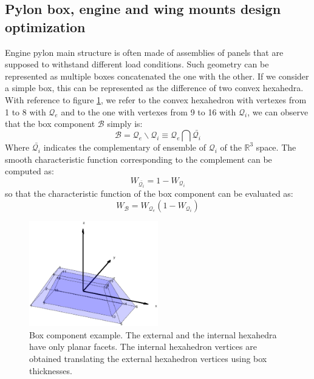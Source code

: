  \subsection{Pylon box, engine and wing mounts design optimization}
  \label{ss3.10.4}
  Engine pylon main structure is often made of assemblies of panels that are supposed to withstand different load conditions. Such geometry can be represented as multiple boxes concatenated the one with the other. If we consider a simple box, this can be represented as the difference of two convex hexahedra. With reference to figure \ref{fig:3.40}, we refer to the convex hexahedron with vertexes from 1 to 8 with $\mathscr{Q}_{e}$ and to the one with vertexes from 9 to 16 with $\mathscr{Q}_{i}$, we can observe that the box component  $\mathscr{B}$ simply is:
  \begin{equation}
\mathscr{B}=\mathscr{Q}_{e}\backslash\mathscr{Q}_{i}\equiv \mathscr{Q}_{e}\bigcap\bar{\mathscr{Q}_{i}}
  \end{equation}
  Where $\bar{\mathscr{Q}_{i}}$ indicates the complementary of ensemble of $\mathscr{Q}_{i}$ of the $\mathbb{R}^3$ space. 
  The smooth characteristic function corresponding to the complement can be computed as:
    \begin{equation}
 W_{\bar{\mathscr{Q}_{i}}}=1-W_{\mathscr{Q}_{i}}
    \end{equation}
    so that the characteristic function of the box component can be evaluated as:
   \begin{equation}
     W_{\mathscr{B}}=W_{\mathscr{Q}_{e}}(1-W_{\mathscr{Q}_{i}})
    \end{equation}
  \begin{figure}[!ht]
       \centering
        \includegraphics[width=0.5\textwidth]{images/Ch3/box_component_plot}
      \caption{Box component example. The external and the internal hexahedra have only planar facets. The internal hexahedron vertices are obtained translating the external hexahedron vertices using box thicknesses.}
      \label{fig:3.40}       %
 \end{figure}
